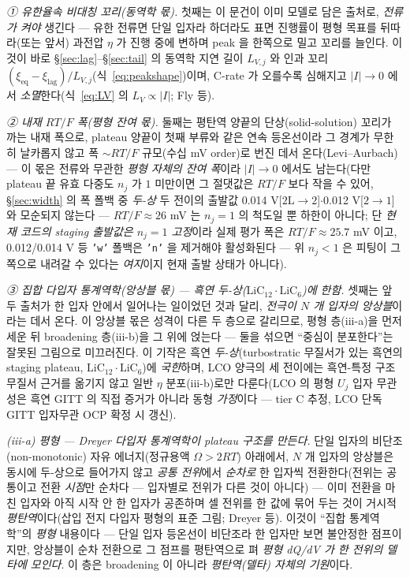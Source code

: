 \documentclass[11pt,a4paper]{article}
\newcommand{\eq}{\mathrm{eq}}
\newcommand{\code}[1]{\texttt{#1}}
\begin{document}
\emph{① 유한율속 비대칭 꼬리(동역학 몫).} 첫째는 이 문건이 이미 모델로 담은 출처로, \emph{전류가 켜야} 생긴다 — 유한
전류면 단일 입자라 하더라도 표면 진행률이 평형 목표를 뒤따라(또는 앞서) 과전압 $\eta$ 가 진행 중에 변하며 peak 을 한쪽으로
밀고 꼬리를 늘인다. 이것이 바로 \S\ref{sec:lag}--\S\ref{sec:tail} 의 동역학 지연 길이 $L_{V,j}$ 와 인과 꼬리
$(\xi_\eq-\xi_\mathrm{lag})/L_{V,j}$(식~\eqref{eq:peakshape})이며, C-rate 가 오를수록 심해지고 $|I|\!\to\!0$ 에서
\emph{소멸}한다(식~\eqref{eq:LV} 의 $L_V\propto|I|$; Fly 등\cite{fly2020}).

\emph{② 내재 $RT/F$ 폭(평형 잔여 몫).} 둘째는 평탄역 양끝의 단상(solid-solution) 꼬리가 까는 내재 폭으로, plateau
양끝이 첫째 부류와 같은 연속 등온선이라 그 경계가 무한히 날카롭지 않고 폭 $\sim RT/F$ 규모(수십 mV order)로 번진 데서
온다(Levi--Aurbach\cite{leviaurbach1999}) — 이 몫은 전류와 무관한 \emph{평형 자체의 잔여 폭}이라 $|I|\!\to\!0$ 에서도
남는다(다만 plateau 끝 유효 다중도 $n_j$ 가 $1$ 미만이면 그 절댓값은 $RT/F$ 보다 작을 수 있어, \S\ref{sec:width}
의 폭 폴백 중 \emph{두-상} 두 전이의 출발값 0.014 V[$2\mathrm L\!\to\!2$]$\cdot$0.012 V[$2\!\to\!1$]와 모순되지 않는다 —
$RT/F\!\approx\!26$ mV 는 $n_j\!=\!1$ 의 척도일 뿐 하한이 아니다; 단 \emph{현재 코드의 staging 출발값은 $n_j\!=\!1$
고정}이라 실제 평가 폭은 $RT/F\!\approx\!25.7$ mV 이고, 0.012/0.014 V 등 \code{'w'} 폴백은 \code{'n'} 을 제거해야
활성화된다 — 위 $n_j\!<\!1$ 은 피팅이 그쪽으로 내려갈 수 있다는 \emph{여지}이지 현재 출발 상태가 아니다).

\emph{③ 집합 다입자 통계역학(앙상블 몫) — 흑연 두-상($\mathrm{LiC_{12}}\cdot\mathrm{LiC_6}$)에 한함.} 셋째는 앞 두 출처가
한 입자 안에서 일어나는 일이었던 것과 달리, \emph{전극이 $N$ 개 입자의 앙상블}이라는 데서 온다. 이 앙상블 몫은 성격이
다른 두 층으로 갈리므로, 평형 층(iii-a)을 먼저 세운 뒤 broadening 층(iii-b)을 그 위에 얹는다 — 둘을 섞으면 ``중심이
분포한다''는 잘못된 그림으로 미끄러진다. 이 기작은 흑연 \emph{두-상}(turbostratic 무질서가 있는 흑연의 staging
plateau, $\mathrm{LiC_{12}}\cdot\mathrm{LiC_6}$)에 \emph{국한}하며, LCO 양극의 세 전이에는 흑연-특정 구조 무질서
근거를 옮기지 않고 일반 $\eta$ 분포(iii-b)로만 다룬다(LCO 의 평형 $U_j$ 입자 무관성은 흑연 GITT\cite{park2021} 의
직접 증거가 아니라 동형 \emph{가정}이다 — tier C 추정, LCO 단독 GITT 입자무관 OCP 확정 시 갱신).

\emph{(iii-a) 평형 — Dreyer 다입자 통계역학이 \emph{plateau 구조}를 만든다.} 단일 입자의 비단조(non-monotonic) 자유
에너지(정규용액 $\Omega>2RT$) 아래에서, $N$ 개 입자의 앙상블은 동시에 두-상으로 들어가지 않고 \emph{공통 전위}에서
\emph{순차로} 한 입자씩 전환한다(전위는 공통이고 전환 \emph{시점}만 순차다 — 입자별로 전위가 다른 것이 아니다) —
이미 전환을 마친 입자와 아직 시작 안 한 입자가 공존하며 셀 전위를 한 값에 묶어 두는
것이 거시적 \emph{평탄역}이다(삽입 전지 다입자 평형의 표준 그림; Dreyer 등\cite{dreyer2010}). 이것이 ``집합 통계역학''의
\emph{평형} 내용이다 — 단일 입자 등온선이 비단조라 한 입자만 보면 불안정한 점프이지만, 앙상블이 순차 전환으로 그 점프를
평탄역으로 펴 \emph{평형 dQ/dV 가 한 전위의 델타에 모인다}. 이 층은 broadening 이 아니라 \emph{평탄역(델타) 자체의 기원}이다.
\end{document}
